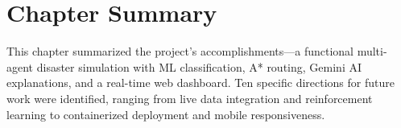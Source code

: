 \section{Chapter Summary}
\label{sec:ch9_summary}

This chapter summarized the project's accomplishments---a functional multi-agent disaster simulation with ML classification, A* routing, Gemini AI explanations, and a real-time web dashboard. Ten specific directions for future work were identified, ranging from live data integration and reinforcement learning to containerized deployment and mobile responsiveness.
